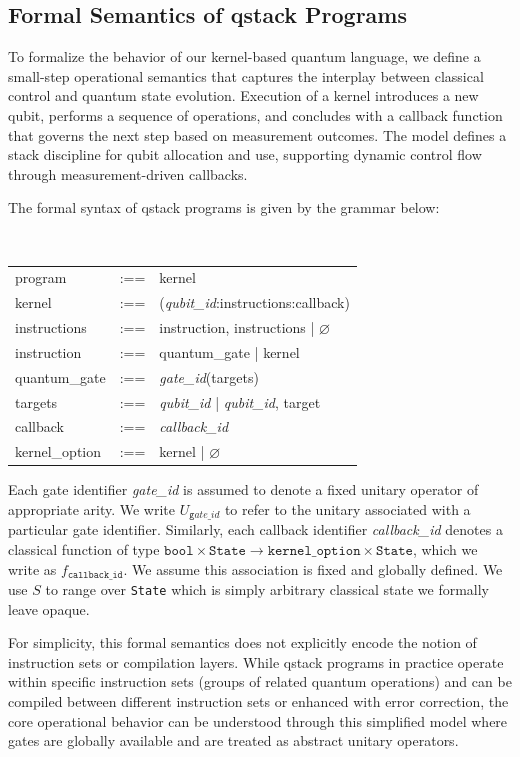 \subsection{Formal Semantics of qstack Programs}

To formalize the behavior of our kernel-based quantum language, we define a small-step operational semantics that captures the interplay between classical control and quantum state evolution. Execution of a kernel introduces a new qubit, performs a sequence of operations, and concludes with a callback function that governs the next step based on measurement outcomes. The model defines a stack discipline for qubit allocation and use, supporting dynamic control flow through measurement-driven callbacks.

The formal syntax of qstack programs is given by the grammar below:


{\tt\small
\begin{tabular}{lrl}
program                 &:==& kernel \\
kernel                  &:==& (\textit{qubit\_id}:instructions:callback) \\
instructions            &:==& instruction, instructions | $\varnothing$ \\
instruction             &:==& quantum\_gate | kernel \\
quantum\_gate           &:==& \textit{gate\_id}(targets) \\
targets                 &:==& \textit{qubit\_id} | \textit{qubit\_id}, target  \\
callback                &:==& \textit{callback\_id} \\
kernel\_option          &:==& kernel | $\varnothing$ \\
\end{tabular}}

Each gate identifier \textit{gate\_id} is assumed to denote a fixed unitary operator of appropriate arity. We write $U_{\mathtt gate\_id}$ to refer to the unitary associated with a particular gate identifier. Similarly, each callback identifier \textit{callback\_id} denotes a classical function of type $\mathtt{bool} \times \mathtt{State} \rightarrow \texttt{kernel\_option} \times \mathtt{State}$, which we write as $f_\mathtt{callback\_id}$. We assume this association is fixed and globally defined. We use $S$ to range over \texttt{State} which is simply arbitrary classical state we formally leave opaque.

For simplicity, this formal semantics does not explicitly encode the notion of instruction sets or compilation layers. While qstack programs in practice operate within specific instruction sets (groups of related quantum operations) and can be compiled between different instruction sets or enhanced with error correction, the core operational behavior can be understood through this simplified model where gates are globally available and are treated as abstract unitary operators. 

